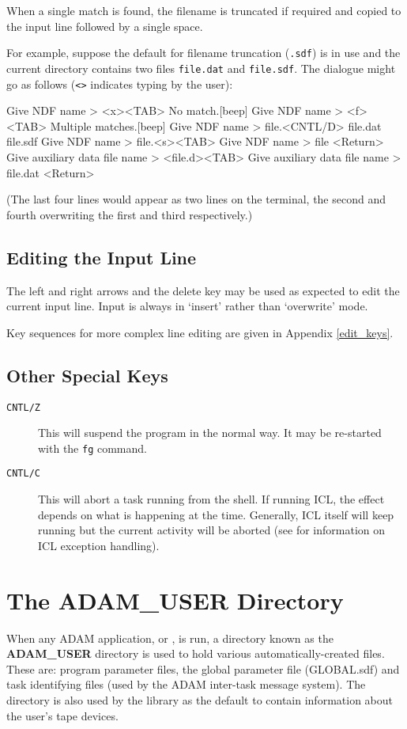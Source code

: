 \documentclass[twoside,11pt,nolof]{starlink}
\begin{document}
When a single match is found, the filename is truncated if required and copied
to the input line followed by a single space.

For example, suppose the default for filename truncation (\texttt{.sdf}) is in
use and the  current directory contains two files \texttt{file.dat} and
\texttt{file.sdf}.
The dialogue might go as follows (\verb!<>! indicates typing by the user):
\begin{small}
\begin{terminalv}
Give NDF name > <x><TAB>
No match.[beep]
Give NDF name > <f><TAB>
Multiple matches.[beep]
Give NDF name > file.<CNTL/D>
file.dat    file.sdf
Give NDF name > file.<s><TAB>
Give NDF name > file <Return>
Give auxiliary data file name > <file.d><TAB>
Give auxiliary data file name > file.dat <Return>
\end{terminalv}
\end{small}

(The last four lines would appear as two lines on the terminal, the second and
fourth overwriting the first and third respectively.)

\subsection{Editing the Input Line}
The left and right arrows and the delete key may be used as expected to edit the
current input line. Input is always in `insert' rather than `overwrite' mode.

Key sequences for more complex line editing are given in Appendix
\ref{edit_keys}.

\subsection{\label{other_special_keys}Other Special Keys}
\begin{description}
\item[\texttt{CNTL/Z}] This will suspend the program in the normal way. It may
be re-started with the \texttt{fg} command.
\item[\texttt{CNTL/C}]
This will abort a task running from the shell.
If running ICL, the effect depends on what is happening at the time.
Generally, ICL itself will keep running but the current activity will be
aborted (see
for information on ICL exception handling).
\end{description}

\section{
\label{adam_user}The ADAM\_USER Directory}
When any ADAM application, or
,
is run, a directory known as the
\textbf{ADAM\_USER} directory is used to hold various automatically-created files.
These are: program parameter files, the global parameter file (GLOBAL.sdf)
and task identifying files (used by the ADAM inter-task message system).
The directory is also used by the
 library as the default to contain
information about the user's tape devices.
\end{document}
